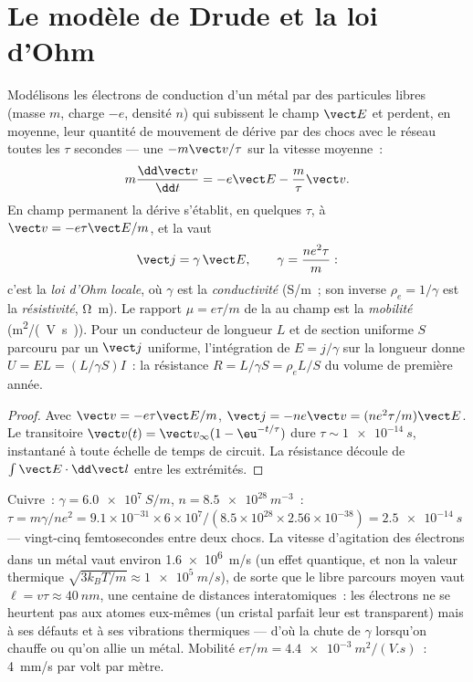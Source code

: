 \section{Le modèle de Drude et la loi d'Ohm}

\begin{proposition}\label{prop:b2:charges-currents-conduction:drude}
Modélisons les électrons de conduction d'un métal par des particules libres (masse $m$,
charge $-e$, densité $n$) qui subissent le champ $\vect E$ et perdent, en moyenne,
leur quantité de mouvement de dérive par des chocs avec le réseau toutes les $\tau$
secondes --- une  $-m\vect v/\tau$ sur la vitesse moyenne~:
\[
m\frac{\dd\vect v}{\dd t} = -e\vect E - \frac m\tau\vect v .
\]
En champ permanent la dérive s'établit, en quelques $\tau$, à $\vect v = -e\tau
\vect E/m$, et la  vaut
\[
\vect j = \gamma\,\vect E , \qquad \gamma = \frac{ne^2\tau}{m} :
\]
c'est la \emph{loi d'Ohm locale}, où $\gamma$ est la \emph{conductivité}
(\unit{S/m}~; son inverse $\rho_e = 1/\gamma$ est la \emph{résistivité},
\unit{\ohm.m}). Le rapport $\mu = e\tau/m$ de la  au champ est la
\emph{mobilité} (\unit{m^2/(V.s)}). Pour un conducteur de longueur $L$ et de
section uniforme $S$ parcouru par un $\vect j$ uniforme, l'intégration de $E = j/\gamma$
sur la longueur donne $U = EL = (L/\gamma S)I$~: la résistance $R = L/\gamma S
= \rho_eL/S$ du volume de première année.
\end{proposition}

\begin{proof}
Avec $\vect v = -e\tau\vect E/m$, $\vect j = -ne\vect v = (ne^2\tau/m)\vect E$. Le
transitoire $\vect v(t) = \vect v_\infty(1 - \eu^{-t/\tau})$ dure $\tau \sim
\qty{1e-14}{s}$, instantané à toute échelle de temps de circuit. La résistance
découle de $\int\vect E\cdot\dd\vect l$ entre les extrémités.
\end{proof}

\begin{example}\label{ex:b2:charges-currents-conduction:copper}
Cuivre~: $\gamma = \qty{6.0e7}{S/m}$, $n = \qty{8.5e28}{m^{-3}}$~: $\tau = m\gamma/ne^2 =
9.1 \times 10^{-31} \times 6 \times 10^7/(8.5 \times 10^{28} \times 2.56 \times 10^{-38}) = \qty{2.5e-14}{s}$
--- vingt-cinq femtosecondes entre deux chocs. La vitesse d'agitation des électrons
dans un métal vaut environ \qty{1.6e6}{m/s} (un effet quantique, et non la valeur
thermique $\sqrt{3k_BT/m} \approx \qty{1e5}{m/s}$), de sorte que le libre parcours moyen vaut $\ell
= v\tau \approx \qty{40}{nm}$, une centaine de distances interatomiques~: les électrons ne se
heurtent pas aux atomes eux-mêmes (un cristal parfait leur est transparent)
mais à ses défauts et à ses vibrations thermiques --- d'où la chute de
$\gamma$ lorsqu'on chauffe ou qu'on allie un métal. Mobilité $e\tau/m =
\qty{4.4e-3}{m^2/(V.s)}$~: \qty{4}{mm/s} par volt par mètre.
\end{example}

